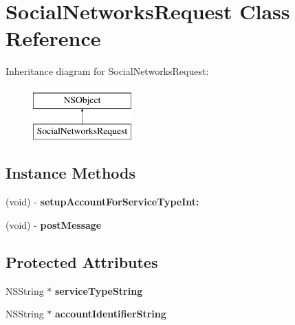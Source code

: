 \hypertarget{interface_social_networks_request}{\section{Social\-Networks\-Request Class Reference}
\label{interface_social_networks_request}
}
Inheritance diagram for Social\-Networks\-Request\-:\begin{figure}[H]
\begin{center}
\leavevmode
\includegraphics[height=2.000000cm]{interface_social_networks_request}
\end{center}
\end{figure}
\subsection*{Instance Methods}
\begin{DoxyCompactItemize}
\item 
\hypertarget{interface_social_networks_request_ab6682f7cab2530d12a34bbe1e59c9843}{(void) -\/ {\bfseries setup\-Account\-For\-Service\-Type\-Int\-:}}\label{interface_social_networks_request_ab6682f7cab2530d12a34bbe1e59c9843}

\item 
\hypertarget{interface_social_networks_request_abe9c76f079552368c2fb2bb4a7434b8f}{(void) -\/ {\bfseries post\-Message}}\label{interface_social_networks_request_abe9c76f079552368c2fb2bb4a7434b8f}

\end{DoxyCompactItemize}
\subsection*{Protected Attributes}
\begin{DoxyCompactItemize}
\item 
\hypertarget{interface_social_networks_request_a4ad54c11c8cb95cf5a0e343eff86d7a5}{N\-S\-String $\ast$ {\bfseries service\-Type\-String}}\label{interface_social_networks_request_a4ad54c11c8cb95cf5a0e343eff86d7a5}

\item 
\hypertarget{interface_social_networks_request_ad36e03b0ccaf96eff9a627075af99784}{N\-S\-String $\ast$ {\bfseries account\-Identifier\-String}}\label{interface_social_networks_request_ad36e03b0ccaf96eff9a627075af99784}

\end{DoxyCompactItemize}
